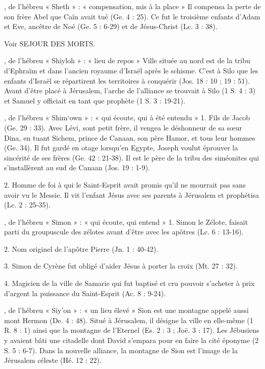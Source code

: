 \begin{multicols}{2}
, de l'hébreu « Sheth » : « compensation, mis à la place »
Il compensa la perte de son frère Abel que Caïn avait tué (Ge. 4 : 25). Ce fut le troisième enfants d'Adam et Eve, ancêtre de Noé (Ge. 5 : 6-29) et de Jésus-Christ (Lc. 3 : 38).


Voir SEJOUR DES MORTS.


, de l'hébreu « Shiyloh » : « lieu de repos »
Ville située au nord est de la tribu d'Ephraïm et dans l'ancien royaume d'Israël après le schisme. C'est à Silo que les enfants d'Israël se répartirent les territoires à conquérir (Jos. 18 : 10 ; 19 : 51). Avant d'être placé à Jérusalem, l'arche de l'alliance se trouvait à Silo (1 S. 4 : 3) et Samuel y officiait en tant que prophète (1 S. 3 : 19-21).


, de l'hébreu « Shim`own » : « qui écoute, qui à été entendu »
1. Fils de Jacob (Ge. 29 : 33). Avec Lévi, sont petit frère, il vengea le déshonneur de sa sœur Dina, en tuant Sichem, prince de Canaan, son père Hamor, et tous leur hommes (Ge. 34). Il fut gardé en otage lorsqu'en Egypte, Joseph voulut éprouver la sincérité de ses frères (Ge. 42 : 21-38). Il est le père de la tribu des siméonites qui s'installèrent au sud de Canaan (Jos. 19 : 1-9).

2. Homme de foi à qui le Saint-Esprit avait promis qu'il ne mourrait pas sans avoir vu le Messie. Il vit l'enfant Jésus avec ses parents à Jérusalem et prophétisa (Lc. 2 : 25-35).


, de l'hébreu « Simon » : « qui écoute, qui entend »
1. Simon le Zélote, faisait parti du groupuscule des zélotes avant d'être avec les apôtres (Lc. 6 : 13-16).

2. Nom originel de l'apôtre Pierre (Jn. 1 : 40-42).

3. Simon de Cyrène fut obligé d'aider Jésus à porter la croix (Mt. 27 : 32).

4. Magicien de la ville de Samarie qui fut baptisé et cru pouvoir s'acheter à prix d'argent la puissance du Saint-Esprit (Ac. 8 : 9-24).


, de l'hébreu « Siy'on » : « un lieu élevé »
Sion est une montagne appelé aussi mont Hermon (De. 4 : 48). Situé à Jérusalem, il désigne la ville en elle-même (1 R. 8 : 1) ainsi que la montagne de l'Eternel (Es. 2 : 3 ; Joë. 3 : 17). Les Jébusiens y avaient bâti une citadelle dont David s'empara pour en faire la cité éponyme (2 S. 5 : 6-7). Dans la nouvelle alliance, la montagne de Sion est l'image de la Jérusalem céleste (Hé. 12 : 22).



\end{multicols}
